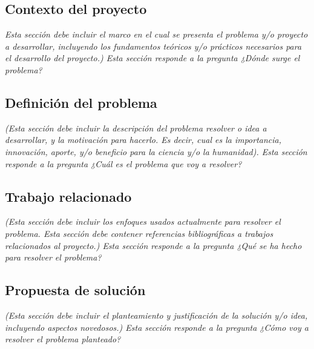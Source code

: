 \documentclass[11pt,letterpaper]{article}
\begin{document}
\subsection{Contexto del proyecto} 
\emph{Esta sección debe incluir el marco en el cual se presenta el problema y/o proyecto a desarrollar, incluyendo los fundamentos teóricos y/o prácticos necesarios para el desarrollo del proyecto.) Esta sección responde a la pregunta ¿Dónde surge el problema?}

\subsection{Definición del problema} 
\emph{(Esta sección debe incluir la descripción del problema resolver o idea a desarrollar, y la motivación para hacerlo. Es decir, cual es la importancia, innovación, aporte, y/o beneficio para la ciencia y/o la humanidad). Esta sección responde a la pregunta ¿Cuál es el problema que voy a resolver?}

\subsection{Trabajo relacionado} 
\emph{(Esta sección debe incluir los enfoques usados actualmente para resolver el problema. Esta sección debe contener referencias bibliográficas a trabajos relacionados al proyecto.) Esta sección responde a la pregunta ¿Qué se ha hecho para resolver el problema?}

\subsection{Propuesta de solución}
\emph{(Esta sección debe incluir el planteamiento y justificación de la solución y/o idea, incluyendo aspectos novedosos.) Esta sección responde a la pregunta ¿Cómo voy a resolver el problema planteado?}

\end{document}
